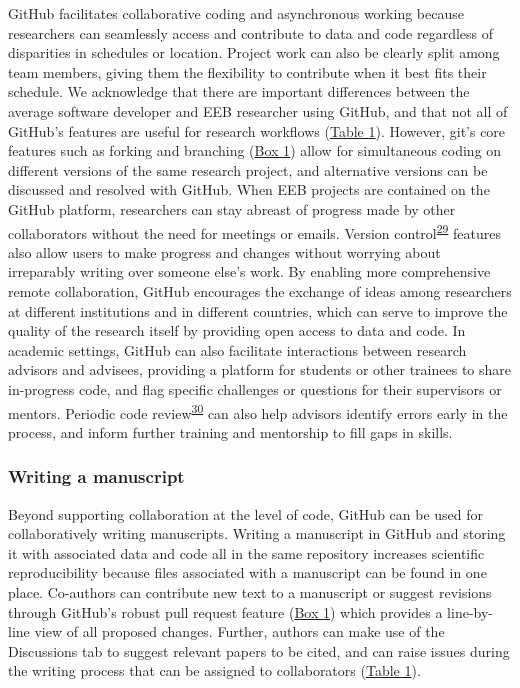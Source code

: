 GitHub facilitates collaborative coding and asynchronous working because researchers can seamlessly access and contribute to data and code regardless of disparities in schedules or location.
Project work can also be clearly split among team members, giving them the flexibility to contribute when it best fits their schedule.
We acknowledge that there are important differences between the average software developer and EEB researcher using GitHub, and that not all of GitHub's features are useful for research workflows (\protect\hyperlink{tbl:roles}{Table 1}).
However, git's core features such as forking and branching (\protect\hyperlink{definitions}{Box 1}) allow for simultaneous coding on different versions of the same research project, and alternative versions can be discussed and resolved with GitHub.
When EEB projects are contained on the GitHub platform, researchers can stay abreast of progress made by other collaborators without the need for meetings or emails.
Version control\textsuperscript{\protect\hyperlink{ref-K7nbP1Ty}{29}} features also allow users to make progress and changes without worrying about irreparably writing over someone else's work.
By enabling more comprehensive remote collaboration, GitHub encourages the exchange of ideas among researchers at different institutions and in different countries, which can serve to improve the quality of the research itself by providing open access to data and code.
In academic settings, GitHub can also facilitate interactions between research advisors and advisees, providing a platform for students or other trainees to share in-progress code, and flag specific challenges or questions for their supervisors or mentors.
Periodic code review\textsuperscript{\protect\hyperlink{ref-hm9PaCLD}{30}} can also help advisors identify errors early in the process, and inform further training and mentorship to fill gaps in skills.

\hypertarget{writing-a-manuscript}{%
\subsubsection{Writing a manuscript}\label{writing-a-manuscript}}

Beyond supporting collaboration at the level of code, GitHub can be used for collaboratively writing manuscripts.
Writing a manuscript in GitHub and storing it with associated data and code all in the same repository increases scientific reproducibility because files associated with a manuscript can be found in one place.
Co-authors can contribute new text to a manuscript or suggest revisions through GitHub's robust pull request feature (\protect\hyperlink{definitions}{Box 1}) which provides a line-by-line view of all proposed changes.
Further, authors can make use of the Discussions tab to suggest relevant papers to be cited, and can raise issues during the writing process that can be assigned to collaborators (\protect\hyperlink{tbl:roles}{Table 1}).

